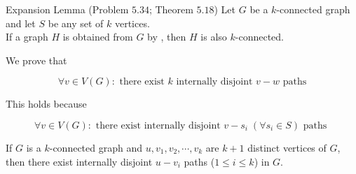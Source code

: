 
\begin{frame}{}
  \begin{exampleblock}{Expansion Lemma (Problem $5.34$; Theorem $5.18$)}
    Let $G$ be a $k$-connected graph and let $S$ be any set of $k$ vertices. \\[8pt]
    If a graph $H$ is obtained from $G$ by ,
    then $H$ is also $k$-connected.
  \end{exampleblock}

  \vspace{0.80cm}
\end{frame}

\begin{frame}{}

  \begin{center}
    We prove that
  \end{center}
  \[
    \forall v \in V(G): \text{ there exist $k$ internally disjoint $v-w$ paths}
  \]


  \pause
  \begin{center}
    This holds because
  \end{center}
  \[
    \forall v \in V(G): \text{ there exist internally disjoint $v-s_i\; (\forall s_i \in S)$ paths }
  \]

  \pause
  \begin{corollary}
    If $G$ is a $k$-connected graph and $u, v_1, v_2, \cdots, v_k$ are $k+1$ distinct vertices of $G$,
    then there exist internally disjoint $u-v_i$ paths ($1 \le i \le k$) in $G$.
  \end{corollary}
\end{frame}

